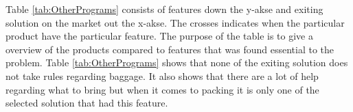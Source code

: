 Table \ref{tab:OtherPrograms} consists of features down the y-akse and exiting solution on the market out the x-akse. The crosses indicates when the particular product have the particular feature. The purpose of the table is to give a overview of the products compared to features that was found essential to the problem.
Table \ref{tab:OtherPrograms} shows that none of the exiting solution does not take rules regarding baggage. It also shows that there are a lot of help regarding what to bring but when it comes to packing it is only one of the selected solution that had this feature.